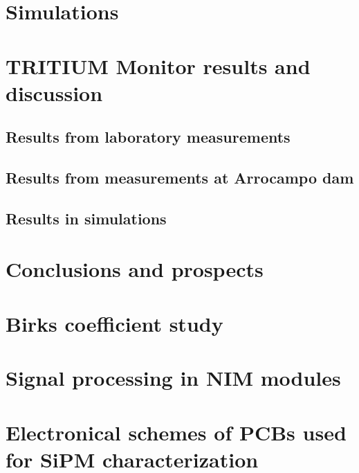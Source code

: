 \documentclass[12pt,a4paper]{book}
\begin{document}
\chapter{Simulations}  \label{chap:Simulations}
\newpage
	
\chapter[Results and discussion]{TRITIUM Monitor results and discussion}\label{chap:Results}
	\section{Results from laboratory measurements}
	\newpage
		
	\section[Results in Arrocampo dam]{Results from measurements at Arrocampo dam}
	\newpage
	
	\section{Results in simulations}
	\newpage		

\chapter{Conclusions and prospects}  \label{chap:Conclusions}

\newpage


\appendix
\appendixpage
\noappendicestocpagenum
\addappheadtotoc

\chapter{Birks coefficient study}\label{App:BirksA}


\chapter{Signal processing in NIM modules}\label{App:ElectronicModulesNIM}


\chapter{Electronical schemes of PCBs used for SiPM characterization}\label{App:ElectronicalSchemesSiPMPCBs}



\end{document}
